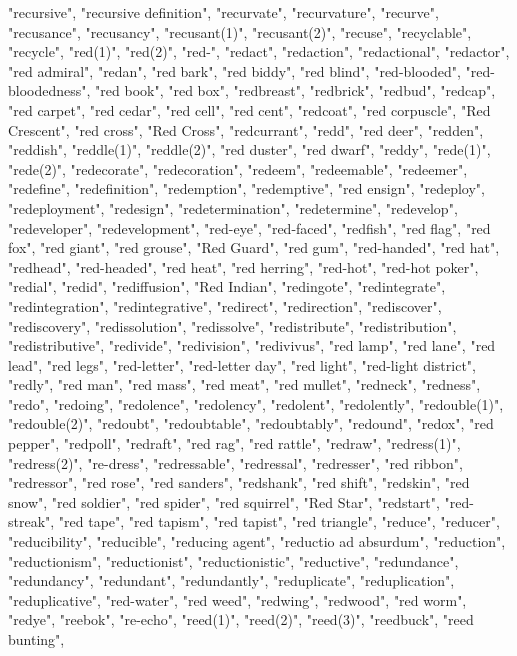 "recursive",
"recursive definition",
"recurvate",
"recurvature",
"recurve",
"recusance",
"recusancy",
"recusant(1)",
"recusant(2)",
"recuse",
"recyclable",
"recycle",
"red(1)",
"red(2)",
"red-",
"redact",
"redaction",
"redactional",
"redactor",
"red admiral",
"redan",
"red bark",
"red biddy",
"red blind",
"red-blooded",
"red-bloodedness",
"red book",
"red box",
"redbreast",
"redbrick",
"redbud",
"redcap",
"red carpet",
"red cedar",
"red cell",
"red cent",
"redcoat",
"red corpuscle",
"Red Crescent",
"red cross",
"Red Cross",
"redcurrant",
"redd",
"red deer",
"redden",
"reddish",
"reddle(1)",
"reddle(2)",
"red duster",
"red dwarf",
"reddy",
"rede(1)",
"rede(2)",
"redecorate",
"redecoration",
"redeem",
"redeemable",
"redeemer",
"redefine",
"redefinition",
"redemption",
"redemptive",
"red ensign",
"redeploy",
"redeployment",
"redesign",
"redetermination",
"redetermine",
"redevelop",
"redeveloper",
"redevelopment",
"red-eye",
"red-faced",
"redfish",
"red flag",
"red fox",
"red giant",
"red grouse",
"Red Guard",
"red gum",
"red-handed",
"red hat",
"redhead",
"red-headed",
"red heat",
"red herring",
"red-hot",
"red-hot poker",
"redial",
"redid",
"rediffusion",
"Red Indian",
"redingote",
"redintegrate",
"redintegration",
"redintegrative",
"redirect",
"redirection",
"rediscover",
"rediscovery",
"redissolution",
"redissolve",
"redistribute",
"redistribution",
"redistributive",
"redivide",
"redivision",
"redivivus",
"red lamp",
"red lane",
"red lead",
"red legs",
"red-letter",
"red-letter day",
"red light",
"red-light district",
"redly",
"red man",
"red mass",
"red meat",
"red mullet",
"redneck",
"redness",
"redo",
"redoing",
"redolence",
"redolency",
"redolent",
"redolently",
"redouble(1)",
"redouble(2)",
"redoubt",
"redoubtable",
"redoubtably",
"redound",
"redox",
"red pepper",
"redpoll",
"redraft",
"red rag",
"red rattle",
"redraw",
"redress(1)",
"redress(2)",
"re-dress",
"redressable",
"redressal",
"redresser",
"red ribbon",
"redressor",
"red rose",
"red sanders",
"redshank",
"red shift",
"redskin",
"red snow",
"red soldier",
"red spider",
"red squirrel",
"Red Star",
"redstart",
"red-streak",
"red tape",
"red tapism",
"red tapist",
"red triangle",
"reduce",
"reducer",
"reducibility",
"reducible",
"reducing agent",
"reductio ad absurdum",
"reduction",
"reductionism",
"reductionist",
"reductionistic",
"reductive",
"redundance",
"redundancy",
"redundant",
"redundantly",
"reduplicate",
"reduplication",
"reduplicative",
"red-water",
"red weed",
"redwing",
"redwood",
"red worm",
"redye",
"reebok",
"re-echo",
"reed(1)",
"reed(2)",
"reed(3)",
"reedbuck",
"reed bunting",
